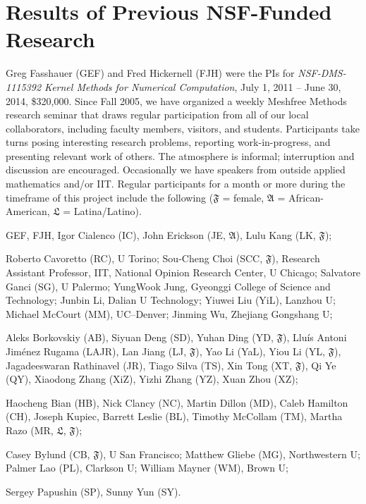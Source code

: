 \documentclass[11pt]{NSFamsart}
\newcommand{\fA}{\mathfrak{A}}
\newcommand{\fF}{\mathfrak{F}}
\newcommand{\fL}{\mathfrak{L}}
\begin{document}
\section{Results of Previous NSF-Funded Research}\label{SectPrevious}

Greg Fasshauer (GEF) and Fred Hickernell (FJH) were the PIs for \emph{NSF-DMS-1115392 Kernel Methods for Numerical Computation}, July 1, 2011 -- June 30, 2014, \$320,000.  Since Fall 2005, we have organized a weekly Meshfree Methods research seminar that draws regular participation from all of our local collaborators, including faculty members, visitors, and students.  Participants take turns posing interesting research problems, reporting work-in-progress, and presenting relevant work of others.  The atmosphere is informal; interruption and discussion are encouraged.  Occasionally we have speakers from outside applied mathematics and/or IIT. Regular participants for a month or more during the timeframe of this project include the following ($\fF$ = female,  $\fA$ = African-American, $\fL$ = Latina/Latino).

\begin{description}[leftmargin=2.5ex]
\item[IIT Faculty] GEF, FJH, Igor Cialenco (IC), John Erickson (JE, $\fA$), Lulu Kang (LK, $\fF$);
\item[Visitors] Roberto Cavoretto (RC), U Torino; Sou-Cheng Choi (SCC, $\fF$), Research Assistant Professor, IIT, National Opinion Research Center, U Chicago; Salvatore Ganci (SG), U Palermo; YungWook Jung, Gyeonggi College of Science and Technology; Junbin Li, Dalian U Technology; Yiuwei Liu (YiL), Lanzhou U; Michael McCourt (MM), UC--Denver; Jinming Wu, Zhejiang Gongshang U;
\item[IIT Graduate Students] Aleks Borkovskiy (AB), Siyuan Deng (SD), Yuhan Ding (YD, $\fF$), Llu\'is Antoni Jim\'enez Rugama (LAJR), Lan Jiang (LJ, $\fF$), Yao Li (YaL), Yiou Li (YL, $\fF$), Jagadeeswaran Rathinavel (JR), Tiago Silva (TS), Xin Tong (XT, $\fF$), Qi Ye (QY), Xiaodong Zhang (XiZ), Yizhi Zhang (YZ), Xuan Zhou (XZ);
\item[IIT Undergraduate Students] Haocheng Bian (HB), Nick Clancy (NC), Martin Dillon (MD), Caleb Hamilton (CH), Joseph Kupiec, Barrett Leslie (BL), Timothy McCollam (TM), Martha Razo (MR, $\fL$, $\fF$);
\item[Other Undergraduate Students] Casey Bylund (CB, $\fF$), U San Francisco; Matthew Gliebe (MG), Northwestern U; Palmer Lao (PL), Clarkson U; William Mayner (WM), Brown U;
\item[High School Students] Sergey Papushin (SP), Sunny Yun (SY).
\end{description}
\end{document}
